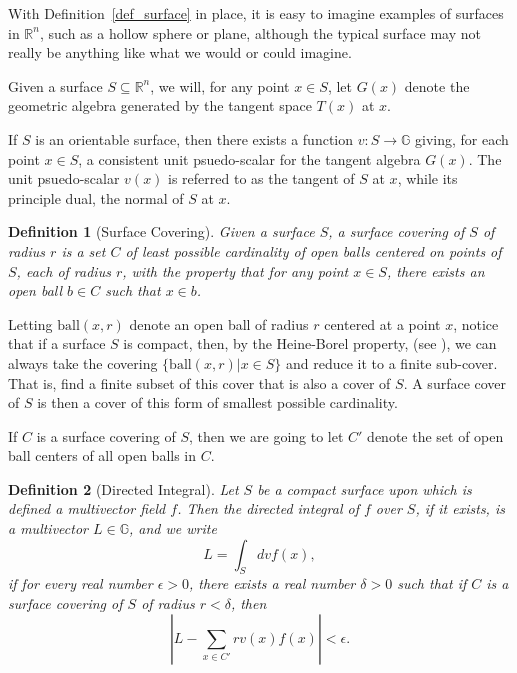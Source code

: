\documentclass[12pt]{article}
\numberwithin{equation}{section}
\newcommand{\G}{\mathbb{G}}
\newcommand{\R}{\mathbb{R}}
\newtheorem{definition}{Definition}[section]
\begin{document}
With Definition~\ref{def_surface} in place, it is easy to imagine examples of surfaces in $\R^n$,
such as a hollow sphere or plane,
although the typical surface may not really be anything like what we would or could imagine.

Given a surface $S\subseteq\R^n$, we will, for any point $x\in S$, let $G(x)$ denote the geometric
algebra generated by the tangent space $T(x)$ at $x$.

If $S$ is an orientable surface, then there exists a function $v:S\to\G$ giving, for
each point $x\in S$, a consistent unit psuedo-scalar for the tangent algebra $G(x)$.
The unit psuedo-scalar $v(x)$ is referred to as the tangent of $S$ at $x$, while its
principle dual, the normal of $S$ at $x$.

\begin{definition}[Surface Covering]\label{def_surface_covering}
Given a surface $S$, a surface covering of $S$ of radius $r$ is a set $C$ of least
possible cardinality of open
balls centered on points of $S$, each of radius $r$, with the property that for any point
$x\in S$, there exists an open ball $b\in C$ such that $x\in b$.
\end{definition}

Letting $\mbox{ball}(x,r)$ denote an open ball of radius $r$
centered at a point $x$, notice that if a surface $S$ is compact, then, by the Heine-Borel property,
(see \cite{}), we can always take the covering $\{\mbox{ball}(x,r)|x\in S\}$ and
reduce it to a finite sub-cover.  That is, find a finite subset of this cover that is
also a cover of $S$.  A surface cover of $S$ is then a cover of this form
of smallest possible cardinality.

If $C$ is a surface covering of $S$, then we are going to let $C'$ denote
the set of open ball centers of all open balls in $C$.

\begin{definition}[Directed Integral]\label{def_directed_integral}
Let $S$ be a compact surface upon which is defined a multivector field $f$.
Then the directed integral of $f$ over $S$, if it exists, is a multivector $L\in\G$, and we write
\begin{equation*}
L = \int_S dv f(x),
\end{equation*}
if for every real number $\epsilon>0$, there exists a real number $\delta>0$ such
that if $C$ is a surface covering of $S$ of radius $r<\delta$, then
\begin{equation*}
\left|L - \sum_{x\in C'} r v(x)f(x)\right|<\epsilon.
\end{equation*}
\end{definition}
\end{document}
